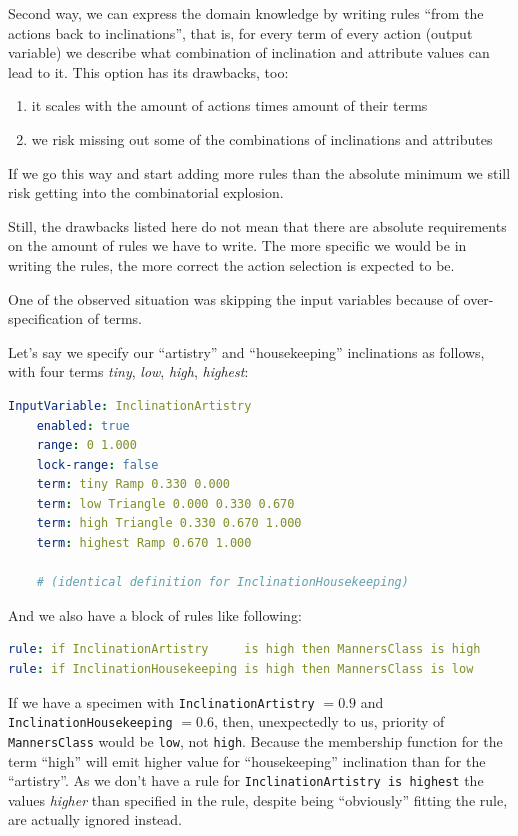 \documentclass[12pt, a4paper]{report}
\begin{document}
	Second way, we can express the domain knowledge by writing rules ``from the actions back to inclinations'', that is, for every term of every action (output variable) we describe what combination of inclination and attribute values can lead to it.
	This option has its drawbacks, too:
	\begin{enumerate}
		\item it scales with the amount of actions times amount of their terms
		\item we risk missing out some of the combinations of inclinations and attributes
	\end{enumerate}
	If we go this way and start adding more rules than the absolute minimum we still risk getting into the combinatorial explosion.
	
	Still, the drawbacks listed here do not mean that there are absolute requirements on the amount of rules we have to write.
	The more specific we would be in writing the rules, the more correct the action selection is expected to be.

	One of the observed situation was skipping the input variables because of over-specification of terms.
	
	Let's say we specify our ``artistry'' and ``housekeeping'' inclinations as follows, with four terms \textit{tiny}, \textit{low}, \textit{high}, \textit{highest}:
	
	\begin{lstlisting}[language=yaml]
InputVariable: InclinationArtistry
	enabled: true
	range: 0 1.000
	lock-range: false
	term: tiny Ramp 0.330 0.000 
	term: low Triangle 0.000 0.330 0.670
	term: high Triangle 0.330 0.670 1.000
	term: highest Ramp 0.670 1.000
	
	# (identical definition for InclinationHousekeeping)
	\end{lstlisting}
	
	And we also have a block of rules like following:
	
	\begin{lstlisting}[language=yaml]
rule: if InclinationArtistry     is high then MannersClass is high
rule: if InclinationHousekeeping is high then MannersClass is low
	\end{lstlisting}
	
	If we have a specimen with \texttt{InclinationArtistry} $= 0.9$ and \texttt{InclinationHousekeeping} $= 0.6$,
	then, unexpectedly to us, priority of \texttt{MannersClass} would be \texttt{low}, not \texttt{high}.
	Because the membership function for the term ``high'' will emit higher value for ``housekeeping'' inclination than for the ``artistry''.
	As we don't have a rule for \texttt{InclinationArtistry is highest} the values \textit{higher} than specified in the rule, despite being ``obviously'' fitting the rule, are actually ignored instead.
	
\end{document}
